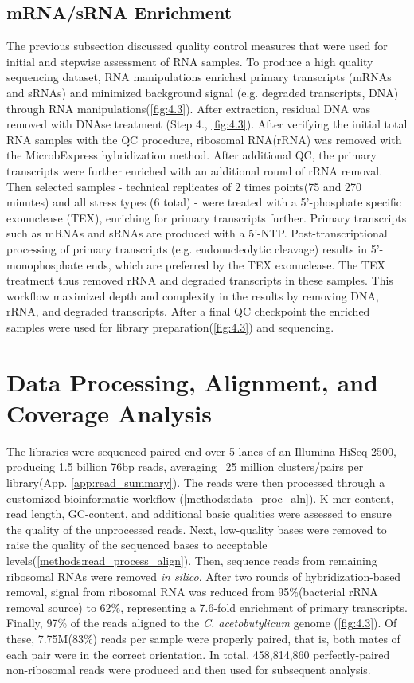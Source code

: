 \subsection{mRNA/sRNA Enrichment}
The previous subsection discussed quality control measures that were used for initial and stepwise assessment of RNA samples. To produce a high quality sequencing dataset, RNA manipulations enriched primary transcripts (mRNAs and sRNAs) and minimized background signal (e.g. degraded transcripts, DNA) through RNA manipulations(\ref{fig:4.3}). After extraction, residual DNA was removed with DNAse treatment (Step 4., \ref{fig:4.3}). After verifying the initial total RNA samples with the QC procedure, ribosomal RNA(rRNA) was removed with the MicrobExpress hybridization method. After additional QC, the primary transcripts were further enriched with an additional round of rRNA removal. Then selected samples - technical replicates of 2 times points(75 and 270 minutes) and all stress types (6 total) - were treated with a 5'-phosphate specific exonuclease (TEX), enriching for primary transcripts further. Primary transcripts such as mRNAs and sRNAs are produced with a 5'-NTP. Post-transcriptional processing of primary transcripts (e.g. endonucleolytic cleavage) results in 5'-monophosphate ends, which are preferred by the TEX exonuclease. The TEX treatment thus removed rRNA and degraded transcripts in these samples. This workflow maximized depth and complexity in the results by removing DNA, rRNA, and degraded transcripts. After a final QC checkpoint the enriched samples were used for library preparation(\ref{fig:4.3}) and sequencing.


\section{Data Processing, Alignment, and Coverage Analysis}
The libraries were sequenced paired-end over 5 lanes of an Illumina HiSeq 2500, producing 1.5 billion 76bp reads, averaging ~25 million clusters/pairs per library(App. \ref{app:read_summary}). The reads were then processed through a customized bioinformatic workflow (\ref{methods:data_proc_aln}). K-mer content, read length, GC-content, and additional basic qualities were assessed to ensure the quality of the unprocessed reads. Next, low-quality bases were removed to raise the quality of the sequenced bases to acceptable levels(\ref{methods:read_process_align}). Then, sequence reads from remaining ribosomal RNAs were removed \textit{in silico}. After two rounds of hybridization-based removal, signal from ribosomal RNA was reduced from 95\%(bacterial rRNA removal source) to 62\%, representing a 7.6-fold enrichment of primary transcripts. Finally, 97\% of the reads aligned to the \textit{C. acetobutylicum} genome (\ref{fig:4.3}). Of these, 7.75M(83\%) reads per sample were properly paired, that is, both mates of each pair were in the correct orientation. In total, 458,814,860 perfectly-paired non-ribosomal reads were produced and then used for subsequent analysis.

